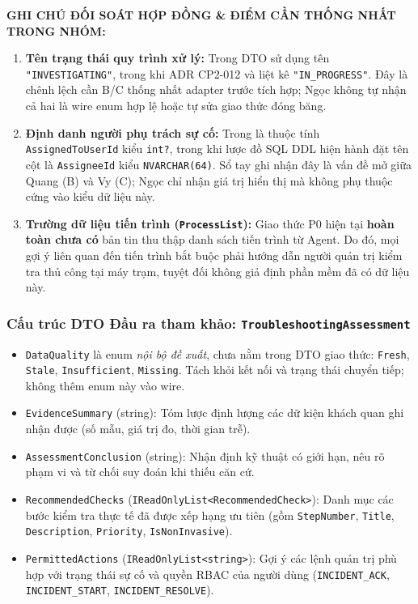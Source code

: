 \documentclass[12pt,a4paper]{article}
\begin{document}
\begin{importantbox}
\textbf{GHI CHÚ ĐỐI SOÁT HỢP ĐỒNG \& ĐIỂM CẦN THỐNG NHẤT TRONG NHÓM:}
\begin{enumerate}[leftmargin=1.5em, itemsep=1pt]
  \item \textbf{Tên trạng thái quy trình xử lý:} Trong DTO  sử dụng tên \texttt{"INVESTIGATING"}, trong khi ADR CP2-012 và  liệt kê \texttt{"IN\_PROGRESS"}. Đây là chênh lệch cần B/C thống nhất adapter trước tích hợp; Ngọc không tự nhận cả hai là wire enum hợp lệ hoặc tự sửa giao thức đóng băng.
  \item \textbf{Định danh người phụ trách sự cố:} Trong  là thuộc tính \texttt{AssignedToUserId} kiểu \texttt{int?}, trong khi lược đồ SQL DDL hiện hành đặt tên cột là \texttt{AssigneeId} kiểu \texttt{NVARCHAR(64)}. Sổ tay ghi nhận đây là vấn đề mở giữa Quang (B) và Vy (C); Ngọc chỉ nhận giá trị hiển thị mà không phụ thuộc cứng vào kiểu dữ liệu này.
  \item \textbf{Trường dữ liệu tiến trình (\texttt{ProcessList}):} Giao thức P0 hiện tại \textbf{hoàn toàn chưa có} bản tin thu thập danh sách tiến trình từ Agent. Do đó, mọi gợi ý liên quan đến tiến trình bắt buộc phải hướng dẫn người quản trị kiểm tra thủ công tại máy trạm, tuyệt đối không giả định phần mềm đã có dữ liệu này.
\end{enumerate}
\end{importantbox}

\subsubsection{Cấu trúc DTO Đầu ra tham khảo: \texttt{TroubleshootingAssessment}}
\begin{itemize}
  \item \texttt{DataQuality} là enum \emph{nội bộ đề xuất}, chưa nằm trong DTO giao thức: \texttt{Fresh}, \texttt{Stale}, \texttt{Insufficient}, \texttt{Missing}. Tách khỏi kết nối và trạng thái chuyển tiếp; không thêm enum này vào wire.
  \item \texttt{EvidenceSummary} (string): Tóm lược định lượng các dữ kiện khách quan ghi nhận được (số mẫu, giá trị đo, thời gian trễ).
  \item \texttt{AssessmentConclusion} (string): Nhận định kỹ thuật có giới hạn, nêu rõ phạm vi và từ chối suy đoán khi thiếu căn cứ.
  \item \texttt{RecommendedChecks} (\texttt{IReadOnlyList<RecommendedCheck>}): Danh mục các bước kiểm tra thực tế đã được xếp hạng ưu tiên (gồm \texttt{StepNumber}, \texttt{Title}, \texttt{Description}, \texttt{Priority}, \texttt{IsNonInvasive}).
  \item \texttt{PermittedActions} (\texttt{IReadOnlyList<string>}): Gợi ý các lệnh quản trị phù hợp với trạng thái sự cố và quyền RBAC của người dùng (\texttt{INCIDENT\_ACK}, \texttt{INCIDENT\_START}, \texttt{INCIDENT\_RESOLVE}).
\end{itemize}
\end{document}
